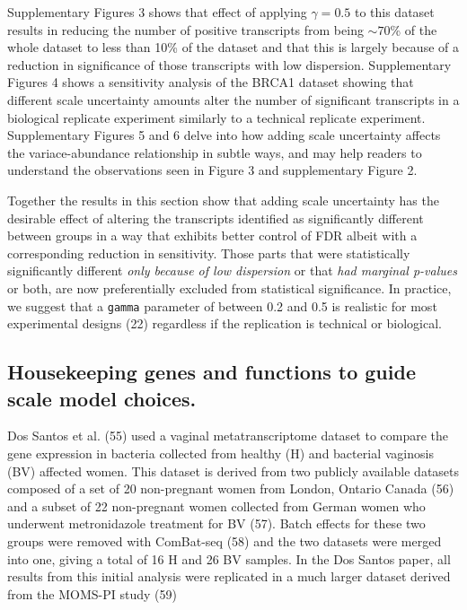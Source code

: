 \documentclass[
]{article}
\begin{document}
Supplementary Figures 3 shows that effect of applying \(\gamma = 0.5\)
to this dataset results in reducing the number of positive transcripts
from being \(\sim 70\)\% of the whole dataset to less than 10\% of the
dataset and that this is largely because of a reduction in significance
of those transcripts with low dispersion. Supplementary Figures 4 shows
a sensitivity analysis of the BRCA1 dataset showing that different scale
uncertainty amounts alter the number of significant transcripts in a
biological replicate experiment similarly to a technical replicate
experiment. Supplementary Figures 5 and 6 delve into how adding scale
uncertainty affects the variace-abundance relationship in subtle ways,
and may help readers to understand the observations seen in Figure 3 and
supplementary Figure 2.

Together the results in this section show that adding scale uncertainty
has the desirable effect of altering the transcripts identified as
significantly different between groups in a way that exhibits better
control of FDR albeit with a corresponding reduction in sensitivity.
Those parts that were statistically significantly different \emph{only
because of low dispersion} or that \emph{had marginal p-values} or both,
are now preferentially excluded from statistical significance. In
practice, we suggest that a \texttt{gamma} parameter of between 0.2 and
0.5 is realistic for most experimental designs (22) regardless if the
replication is technical or biological.

\subsection{Housekeeping genes and functions to guide scale model
choices.}\label{housekeeping-genes-and-functions-to-guide-scale-model-choices.}

Dos Santos et al. (55) used a vaginal metatranscriptome dataset to
compare the gene expression in bacteria collected from healthy (H) and
bacterial vaginosis (BV) affected women. This dataset is derived from
two publicly available datasets composed of a set of 20 non-pregnant
women from London, Ontario Canada (56) and a subset of 22 non-pregnant
women collected from German women who underwent metronidazole treatment
for BV (57). Batch effects for these two groups were removed with
ComBat-seq (58) and the two datasets were merged into one, giving a
total of 16 H and 26 BV samples. In the Dos Santos paper, all results
from this initial analysis were replicated in a much larger dataset
derived from the MOMS-PI study (59)
\end{document}
